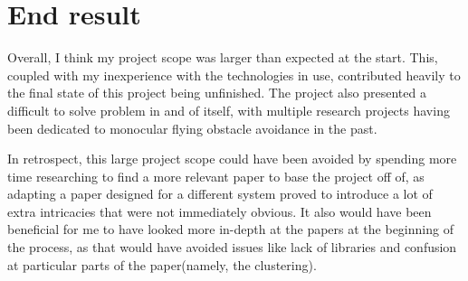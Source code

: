 \section{End result}
Overall, I think my project scope was larger than expected at the start. This, coupled with my inexperience with the technologies in use, contributed heavily to the final state of this project being unfinished. The project also presented a difficult to solve problem in and of itself, with multiple research projects having been dedicated to monocular flying obstacle avoidance in the past.

In retrospect, this large project scope could have been avoided by spending more time researching to find a more relevant paper to base the project off of, as adapting a paper designed for a different system proved to introduce a lot of extra intricacies that were not immediately obvious. It also would have been beneficial for me to have looked more in-depth at the papers at the beginning of the process, as that would have avoided issues like lack of libraries and confusion at particular parts of the paper(namely, the clustering). 